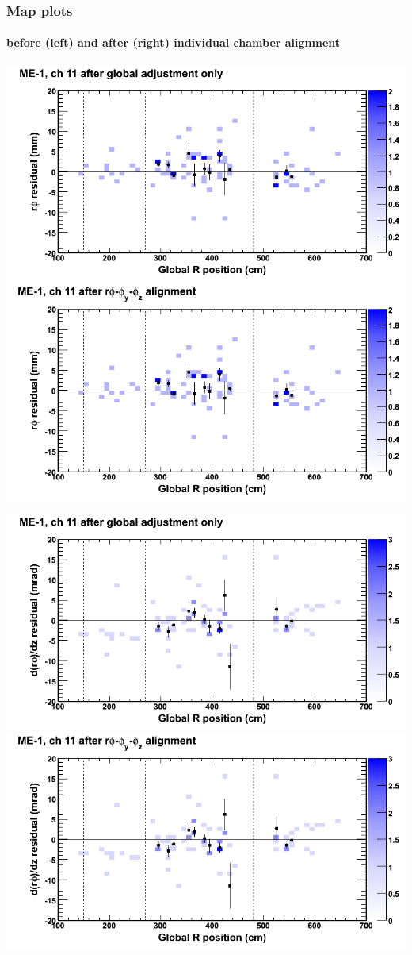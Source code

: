 \documentclass[compress]{beamer}
\begin{document}
\begin{frame}
\frametitle{Map plots}
\framesubtitle{before (left) and after (right) individual chamber alignment}
\includegraphics[width=0.5\linewidth]{ringmapplots_3dof/before_CSCvsr_mem1ch11_x.png} \includegraphics[width=0.5\linewidth]{ringmapplots_3dof/after_CSCvsr_mem1ch11_x.png}

\includegraphics[width=0.5\linewidth]{ringmapplots_3dof/before_CSCvsr_mem1ch11_dxdz.png} \includegraphics[width=0.5\linewidth]{ringmapplots_3dof/after_CSCvsr_mem1ch11_dxdz.png}
\end{frame}
\end{document}
